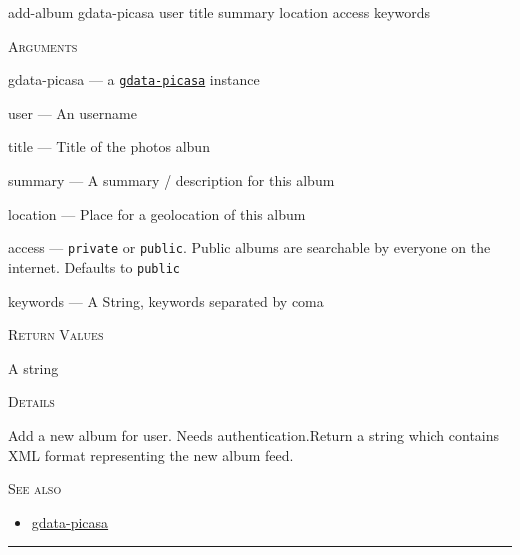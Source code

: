 \documentclass[a4paper]{report}
\begin{document}
    \label{cl-gdata-picasa__fun__add-album}
    \begin{defun}[Function]
    add-album gdata-picasa user title summary location access keywords


    
    \bigskip
    \textsc{Arguments}

gdata-picasa
	--- a \hyperref[cl-gdata-picasa__class__gdata-picasa]{\texttt{gdata-picasa}}
   instance

user
	--- An username

title
	--- Title of the photos albun

summary
	--- A summary / description for this album

location
	--- Place for a geolocation of this album

access
	--- \texttt{private} or \texttt{public}. Public albums are searchable by everyone on the internet. Defaults to \texttt{public}

keywords
	--- A String, keywords separated by coma




    
    \bigskip
    \textsc{Return Values}

A string


	
    \bigskip
    \textsc{Details}

Add a new album for user. Needs authentication.Return a string which contains XML format representing the new album feed.


      
    \bigskip
    \textsc{See also}


	
    \begin{itemize}
    
	  
    \item
    \hyperref[cl-gdata-picasa__class__gdata-picasa]{gdata-picasa}
    
	
    \end{itemize}
  
      


    
    \end{defun}
  
  

    \rule{\linewidth}{0.1mm}
    
\end{document}
